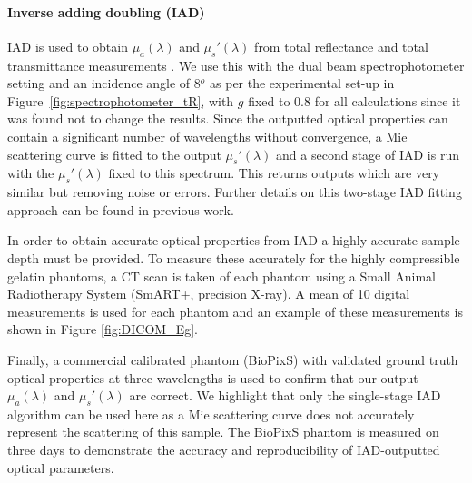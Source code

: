 \paragraph{Inverse adding doubling (IAD)}\label{sec:methodsphantommeasure2}
IAD is used to obtain $\mu_a(\lambda)$ and $\mu_s'(\lambda)$ from total reflectance and total transmittance measurements \cite{Prahl2017}. We use this with the dual beam spectrophotometer setting and an incidence angle of 8$^o$ as per the experimental set-up in Figure~\ref{fig:spectrophotometer_tR}, with $g$ fixed to 0.8 for all calculations since it was found not to change the results. Since the outputted optical properties can contain a significant number of wavelengths without convergence, a Mie scattering curve is fitted to the output $\mu_s'(\lambda)$ and a second stage of IAD is run with the $\mu_s'(\lambda)$ fixed to this spectrum.
This returns outputs which are very similar but removing noise or errors.
Further details on this two-stage IAD fitting approach can be found in previous work\cite{Xie2021}. 

In order to obtain accurate optical properties from IAD a highly accurate sample depth must be provided.
To measure these accurately for the highly compressible gelatin phantoms, a CT scan is taken of each phantom using a Small Animal Radiotherapy System (SmART+, precision X-ray). A mean of 10 digital measurements is used for each phantom and an example of these measurements is shown in Figure \ref{fig:DICOM_Eg}.

Finally, a commercial calibrated phantom (BioPixS) with validated ground truth optical properties at three wavelengths is used to confirm that our output $\mu_a(\lambda)$ and $\mu_s'(\lambda)$ are correct. We highlight that only the single-stage IAD algorithm can be used here as a Mie scattering curve does not accurately represent the scattering of this sample. The BioPixS phantom is measured on three days to demonstrate the accuracy and reproducibility of IAD-outputted optical parameters.


